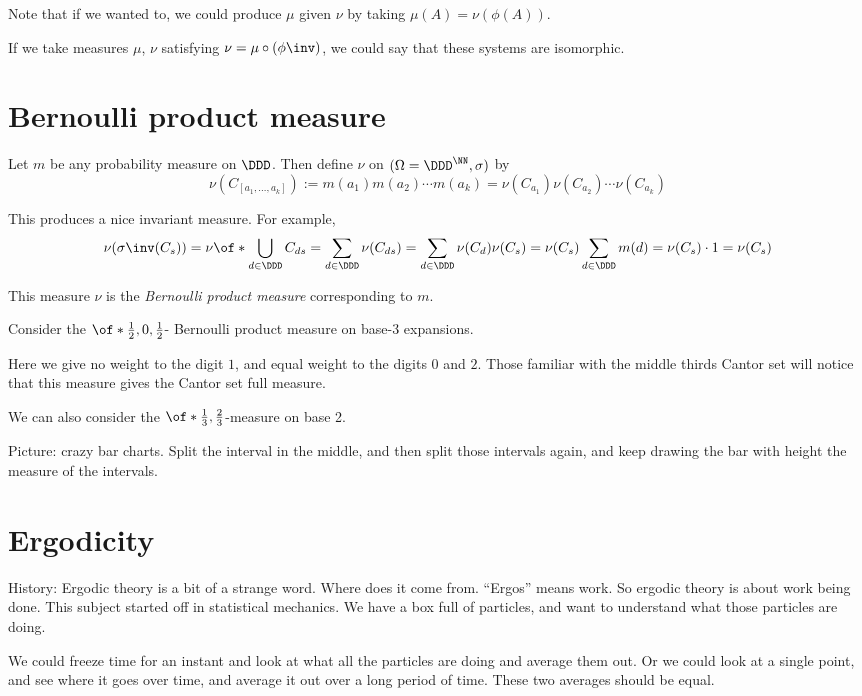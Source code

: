 \documentclass{article}
\newcommand\cylset[1]{C_{[{#1}]}}
\theoremstyle{remark}
\begin{document}
Note that if we wanted to, we could produce
$\mu$ given $\nu$ by taking $\mu(A) = \nu(\phi(A))$.

If we take measures $\mu$, $\nu$ satisfying
$\nu = \mu\circ (\phi\inv)$,
we could say that these systems
are isomorphic.

\section{Bernoulli product measure}

Let $m$ be any probability measure on $\DDD$.
Then define $\nu$ on $(\Omega=\DDD^\NN,\sigma)$
by 
\[ \nu(\cylset{a_1,\ldots,a_k})
:=m(a_1)m(a_2)\cdots m(a_k)
= \nu(C_{a_1})\nu(C_{a_2})
\cdots 
\nu(C_{a_k})
\]

This produces a nice invariant measure.
For example,
\[ \nu(\sigma\inv(C_s)) 
= \nu\of*{\bigcup_{d\in\DDD} C_{ds}}
=\sum_{d\in\DDD} \nu(C_{ds})
=\sum_{d\in\DDD} \nu(C_d)\nu(C_s)
=\nu(C_s) \sum_{d\in\DDD} m(d)
=\nu(C_s) \cdot 1
= \nu(C_s)
\]

\begin{definition}
    This measure $\nu$
    is the \emph{Bernoulli product measure}
    corresponding to $m$.
\end{definition}

Consider the $\of*{\frac{1}{2},0,\frac{1}{2}}$-
Bernoulli product measure on base-3 expansions.

Here we give no weight to the digit $1$, and 
equal weight to the digits $0$ and $2$. Those 
familiar with the middle thirds Cantor set will
notice that this measure gives the Cantor set
full measure.

We can also consider the
$\of*{\frac{1}{3},\frac{2}{3}}$-measure on
base 2.

Picture: crazy bar charts. Split the interval in
the middle, and then split those intervals again,
and keep drawing the bar with height the measure of
the intervals.

\section{Ergodicity}

History: Ergodic theory is a bit of a strange word.
Where does it come from. ``Ergos'' means work.
So ergodic theory is about work being done. This 
subject started off in statistical mechanics. 
We have a box full of particles, and want to understand
what those particles are doing. 

We could freeze time for an instant and look at what all the 
particles are doing and average them out.
Or we could look at a single point,
and see where it goes over time, and average it out
over a long period of time. These two averages should
be equal.
\end{document}
